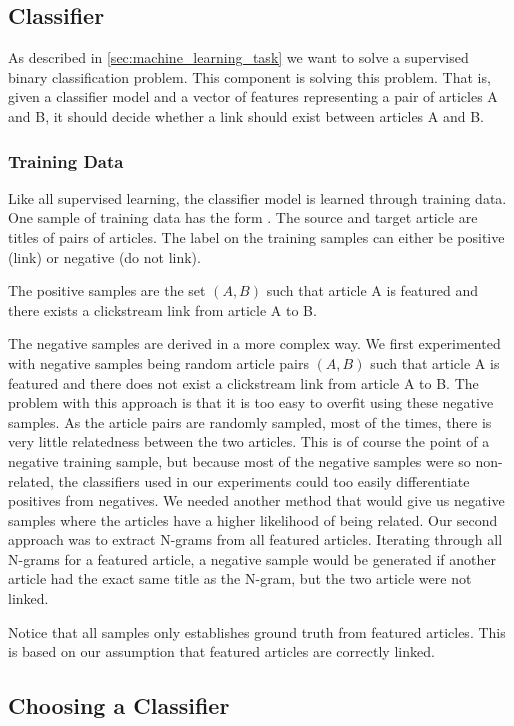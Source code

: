 \subsection{Classifier}
As described in \cref{sec:machine_learning_task} we want to solve a supervised binary classification problem. This component is solving this problem. That is, given a classifier model and a vector of features representing a pair of articles A and B, it should decide whether a link should exist between articles A and B.

\subsubsection{Training Data}
Like all supervised learning, the classifier model is learned through training data. One sample of training data has the form . The source and target article are titles of pairs of articles. The label on the training samples can either be positive (link) or negative (do not link).

The positive samples are the set $(A,B)$ such that article A is featured and there exists a clickstream link from article A to B.

The negative samples are derived in a more complex way. We first experimented with negative samples being random article pairs $(A,B)$ such that article A is featured and there does not exist a clickstream link from article A to B. The problem with this approach is that it is too easy to overfit using these negative samples. As the article pairs are randomly sampled, most of the times, there is very little relatedness between the two articles. This is of course the point of a negative training sample, but because most of the negative samples were so non-related, the classifiers used in our experiments could too easily differentiate positives from negatives. We needed another method that would give us negative samples where the articles have a higher likelihood of being related. Our second approach was to extract N-grams from all featured articles. Iterating through all N-grams for a featured article, a negative sample would be generated if another article had the exact same title as the N-gram, but the two article were not linked.

Notice that all samples only establishes ground truth from featured articles. This is based on our assumption that featured articles are correctly linked.

\subsection{Choosing a Classifier}
